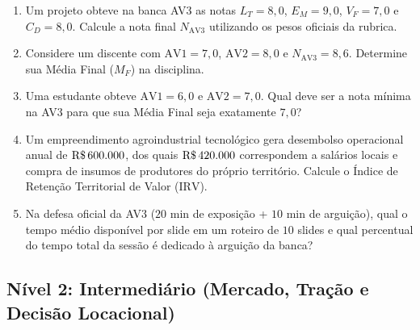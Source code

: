 \begin{enumerate}[leftmargin=1.5em, itemsep=4pt]
  \item Um projeto obteve na banca AV3 as notas $L_T = 8{,}0$, $E_M = 9{,}0$, $V_F = 7{,}0$ e $C_D = 8{,}0$. Calcule a nota final $N_{\text{AV3}}$ utilizando os pesos oficiais da rubrica.
  \espacoResolucao[1.8cm]

  \item Considere um discente com $\text{AV1} = 7{,}0$, $\text{AV2} = 8{,}0$ e $N_{\text{AV3}} = 8{,}6$. Determine sua Média Final ($M_F$) na disciplina.
  \espacoResolucao[1.8cm]

  \item Uma estudante obteve $\text{AV1} = 6{,}0$ e $\text{AV2} = 7{,}0$. Qual deve ser a nota mínima na AV3 para que sua Média Final seja exatamente $7{,}0$?
  \espacoResolucao[1.8cm]

  \item Um empreendimento agroindustrial tecnológico gera desembolso operacional anual de $\text{R\$\,}{600.000}$, dos quais $\text{R\$\,}{420.000}$ correspondem a salários locais e compra de insumos de produtores do próprio território. Calcule o Índice de Retenção Territorial de Valor ($\text{IRV}$).
  \espacoResolucao[1.8cm]

  \item Na defesa oficial da AV3 ($20$ min de exposição + $10$ min de arguição), qual o tempo médio disponível por slide em um roteiro de $10$ slides e qual percentual do tempo total da sessão é dedicado à arguição da banca?
  \espacoResolucao[1.8cm]
\end{enumerate}

\subsection*{Nível 2: Intermediário (Mercado, Tração e Decisão Locacional)}

